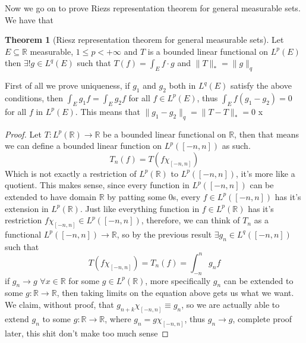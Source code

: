 \documentclass[13pt]{article}
\theoremstyle{definition} --- default
\newtheorem{theorem}{Theorem}
\theoremstyle{definition}
\theoremstyle{remark}
\begin{document}
	Now we go on to prove Riezs representation theorem for general measurable sets. We have that 
	\begin{theorem}[Riesz representation theorem for general measurable sets]
		Let $E \subseteq \mathbb{R}$ measurable, $1 \leq p < +\infty$ and $T$ is a bounded linear functional on $L^p(E)$ then $\exists! g \in L^q(E)$ such that $T(f) = \int_{E} f\cdot g$ and $\|T\|_* = \|g\|_q$
	\end{theorem}
	First of all we prove uniqueness, if $g_1$ and $g_2$ both in $L^q(E)$ satisfy the above conditions, then $\int_E g_1 f = \int_E g_2 f$ for all $f \in L^p(E)$, thus $\int_E f (g_1-g_2) = 0$ for all $f$ in $L^p(E)$. This means that $\|g_1 - g_2\|_q = \|T - T\|_* = 0$ x
	\begin{proof}
		Let $T \colon L^p(\mathbb{R}) \to \mathbb{R}$ be a bounded linear functional on $\mathbb{R}$, then that means we can define a bounded linear function on $L^p([-n,n])$ as such. 
		$$ T_n(f) = T(f \chi_{[-n,n]}) $$
		Which is not exactly a restriction of $L^p(\mathbb{R})$ to $L^p([-n,n])$, it's more like a quotient. This makes sense, since every function in $L^p([-n,n])$ can be extended to have domain $\mathbb{R}$ by patting some $0$s, every $f \in L^p([-n,n])$ has it's extension in $L^p(\mathbb{R})$. Just like everything function in $f \in L^p(\mathbb{R})$ has it's restriction $f \chi_{[-n,n]} \in L^p([-n,n])$,  therefore, we can think of $T_n$ as a functional $L^p([-n,n]) \to \mathbb{R}$, so by the previous result $\exists g_n \in L^q([-n,n])$ such that 
		$$T(f \chi_{[-n,n]}) = T_n(f) = \int_{-n}^n g_n f  $$
		if $g_n \to g$ $\forall x \in \mathbb{R}$ for some $g \in L^p(\mathbb{R})$, more specifically $g_n$ can be extended to some $g\colon \mathbb{R} \to \mathbb{R}$, then taking limits on the equation above gets us what we want. We claim, without proof, that $g_{n+k} \chi_{[-n,n]} \equiv g_n$, so we are actually able to extend $g_n$ to some $g \colon \mathbb{R} \to \mathbb{R}$, where $g_n = g \chi_{[-n,n]}$, thus $g_n \to g$,
		complete proof later, this shit don't make too much sense
		
		
	\end{proof}
\end{document}
